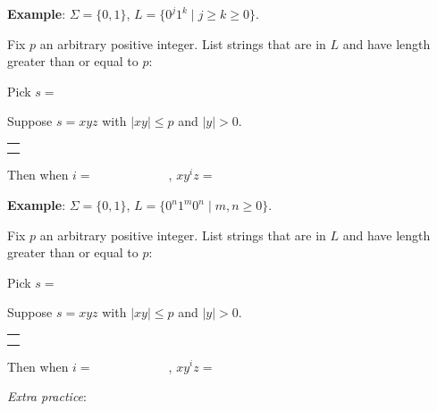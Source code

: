 \documentclass[12pt, oneside]{article}
\begin{document}
\vspace{30pt} 

{\bf Example}: $\Sigma  =  \{0,1\}$, $L = \{0^j1^k  \mid j \geq k  \geq 0\}$.

Fix $p$ an arbitrary positive integer. List strings that are in $L$ and have length  greater than or equal  to $p$:

\vspace{10pt}

Pick $s = $


Suppose $s = xyz$ with  $|xy|  \leq  p$ and $|y| > 0$.
\begin{center}
\begin{tabular}{|c|}
\hline
 \\
\hspace{4in} \\
\hline
\end{tabular}
\end{center}
Then when $i = \hspace{1in}$, $xy^i z  = \hspace{1in}$



\vspace{30pt} 

{\bf Example}: $\Sigma  =  \{0,1\}$, $L = \{0^n1^m0^n  \mid m,n  \geq 0\}$.

Fix $p$ an arbitrary positive integer. List strings that are in $L$ and have length  greater than or equal  to $p$:

\vspace{10pt}

Pick $s = $


Suppose $s = xyz$ with  $|xy|  \leq  p$ and $|y| > 0$.
\begin{center}
\begin{tabular}{|c|}
\hline
 \\
\hspace{4in} \\
\hline
\end{tabular}
\end{center}
Then when $i = \hspace{1in}$, $xy^i z  = \hspace{1in}$

\newpage
{\it Extra practice}:
\end{document}

